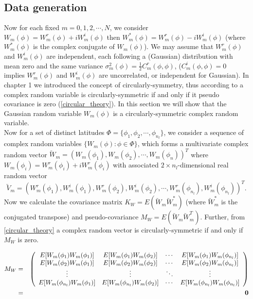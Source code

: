 	\subsection{Data generation}
			
	Now for each fixed $m = 0, 1, 2, \cdots, N$, we consider  $W_m(\phi) = W_m^r(\phi) + i W_m^i(\phi)$ then $W_m^*(\phi) = W_m^r(\phi) - i W_m^i(\phi)$ (where $W_m^*(\phi)$ is the complex conjugate of $W_m(\phi)$). We may assume that $W_m^r(\phi)$ and $W_m^i(\phi)$ are independent, each following a (Gaussian) distribution with mean zero and the same variance $\sigma_m^2(\phi) = \frac{1}{2}C_m^r(\phi, \phi)$, ($C_m^i(\phi, \phi) = 0$ implies $W_m^r(\phi)$ and $W_m^i(\phi)$ are uncorrelated, or independent for Gaussian). In chapter 1 we introduced the concept of circularly-symmetry, thus according to \cite{Gallager2008} a complex random variable is circularly-symmetric if and only if it pseudo covariance is zero (\ref{circular_theory}). In this section we will show that the Gaussian random variable $W_m(\phi)$ is a circularly-symmetric complex random variable.  \\
			
	Now for a set of distinct latitudes $\Phi = \{\phi_1, \phi_2, \cdots, \phi_{n_l}\}$, we consider a sequence of complex random variables $\{W_m(\phi): \phi \in \Phi\}$, which forms a multivariate complex random vector $\utilde{W}_m = (W_m(\phi_1), W_m(\phi_2), \cdots, W_m(\phi_n))^T$ where $W_m(\phi_i) = W_m^r(\phi_i) + iW_m^r(\phi_i)$ with associated $2\times n_l$-dimensional real random vector
	$$\utilde{V}_m = (W_m^r(\phi_1), W_m^i(\phi_1),W_m^r(\phi_2), W_m^i(\phi_2),\cdots, W_m^r(\phi_{n_l}), W_m^i(\phi_{n_l}))^T.$$
	Now we calculate the covariance matrix $K_W = E(\utilde{W}_m\utilde{W}_m^*)$ (where $\utilde{W}_m^*$ is the conjugated transpose) and pseudo-covariance $M_W = E(\utilde{W}_m\utilde{W}_m^T)$. Further, from \ref{circular_theory} a complex random vector is circularly-symmetric if and only if $M_W$ is zero.
			
	\begin{eqnarray*}
		M_W & = & \left(\begin{array}{cccc}
		E[W_m(\phi_1) W_m(\phi_1) ] & E[W_m(\phi_1) W_m(\phi_2) ]  & \cdots & E[W_m(\phi_1) W_m(\phi_{n_l}) ]\\
		E[W_m(\phi_2) W_m(\phi_1) ] & E[W_m(\phi_2) W_m(\phi_2) ]  & \cdots & E[W_m(\phi_2) W_m(\phi_{n_l}) ]\\
		\vdots & \vdots  & \ddots & \vdots \\
		E[W_m(\phi_{n_l}) W_m(\phi_1) ] & E[W_m(\phi_{n_l}) W_m(\phi_2) ]  & \cdots & E[W_m(\phi_{n_l}) W_m(\phi_{n_l})]
		\end{array}
		\right)\\
		&=& {\bf 0}
	\end{eqnarray*}
			
